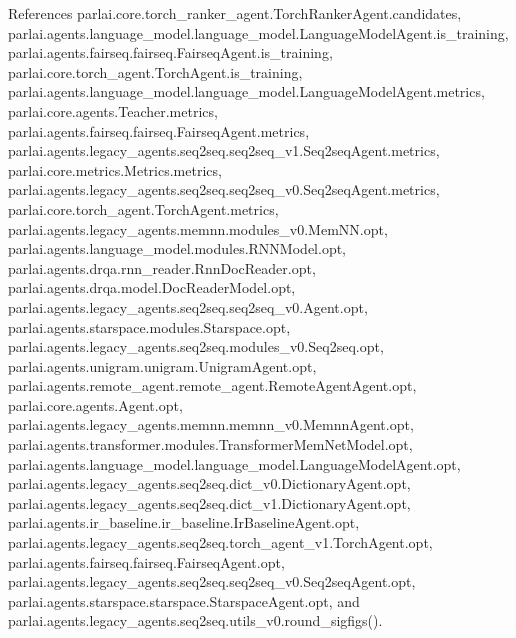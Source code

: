 References parlai.\+core.\+torch\+\_\+ranker\+\_\+agent.\+Torch\+Ranker\+Agent.\+candidates, parlai.\+agents.\+language\+\_\+model.\+language\+\_\+model.\+Language\+Model\+Agent.\+is\+\_\+training, parlai.\+agents.\+fairseq.\+fairseq.\+Fairseq\+Agent.\+is\+\_\+training, parlai.\+core.\+torch\+\_\+agent.\+Torch\+Agent.\+is\+\_\+training, parlai.\+agents.\+language\+\_\+model.\+language\+\_\+model.\+Language\+Model\+Agent.\+metrics, parlai.\+core.\+agents.\+Teacher.\+metrics, parlai.\+agents.\+fairseq.\+fairseq.\+Fairseq\+Agent.\+metrics, parlai.\+agents.\+legacy\+\_\+agents.\+seq2seq.\+seq2seq\+\_\+v1.\+Seq2seq\+Agent.\+metrics, parlai.\+core.\+metrics.\+Metrics.\+metrics, parlai.\+agents.\+legacy\+\_\+agents.\+seq2seq.\+seq2seq\+\_\+v0.\+Seq2seq\+Agent.\+metrics, parlai.\+core.\+torch\+\_\+agent.\+Torch\+Agent.\+metrics, parlai.\+agents.\+legacy\+\_\+agents.\+memnn.\+modules\+\_\+v0.\+Mem\+N\+N.\+opt, parlai.\+agents.\+language\+\_\+model.\+modules.\+R\+N\+N\+Model.\+opt, parlai.\+agents.\+drqa.\+rnn\+\_\+reader.\+Rnn\+Doc\+Reader.\+opt, parlai.\+agents.\+drqa.\+model.\+Doc\+Reader\+Model.\+opt, parlai.\+agents.\+legacy\+\_\+agents.\+seq2seq.\+seq2seq\+\_\+v0.\+Agent.\+opt, parlai.\+agents.\+starspace.\+modules.\+Starspace.\+opt, parlai.\+agents.\+legacy\+\_\+agents.\+seq2seq.\+modules\+\_\+v0.\+Seq2seq.\+opt, parlai.\+agents.\+unigram.\+unigram.\+Unigram\+Agent.\+opt, parlai.\+agents.\+remote\+\_\+agent.\+remote\+\_\+agent.\+Remote\+Agent\+Agent.\+opt, parlai.\+core.\+agents.\+Agent.\+opt, parlai.\+agents.\+legacy\+\_\+agents.\+memnn.\+memnn\+\_\+v0.\+Memnn\+Agent.\+opt, parlai.\+agents.\+transformer.\+modules.\+Transformer\+Mem\+Net\+Model.\+opt, parlai.\+agents.\+language\+\_\+model.\+language\+\_\+model.\+Language\+Model\+Agent.\+opt, parlai.\+agents.\+legacy\+\_\+agents.\+seq2seq.\+dict\+\_\+v0.\+Dictionary\+Agent.\+opt, parlai.\+agents.\+legacy\+\_\+agents.\+seq2seq.\+dict\+\_\+v1.\+Dictionary\+Agent.\+opt, parlai.\+agents.\+ir\+\_\+baseline.\+ir\+\_\+baseline.\+Ir\+Baseline\+Agent.\+opt, parlai.\+agents.\+legacy\+\_\+agents.\+seq2seq.\+torch\+\_\+agent\+\_\+v1.\+Torch\+Agent.\+opt, parlai.\+agents.\+fairseq.\+fairseq.\+Fairseq\+Agent.\+opt, parlai.\+agents.\+legacy\+\_\+agents.\+seq2seq.\+seq2seq\+\_\+v0.\+Seq2seq\+Agent.\+opt, parlai.\+agents.\+starspace.\+starspace.\+Starspace\+Agent.\+opt, and parlai.\+agents.\+legacy\+\_\+agents.\+seq2seq.\+utils\+\_\+v0.\+round\+\_\+sigfigs().

